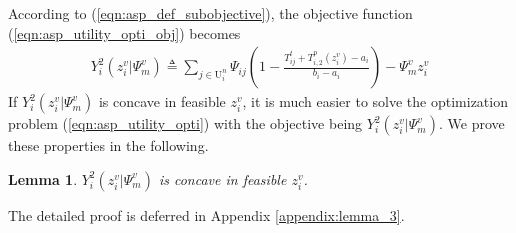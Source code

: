 \documentclass[10pt,journal, compsoc]{IEEEtran}
\newtheorem{lemma}{Lemma}
\begin{document}
According to %
(\ref{eqn:asp_def_subobjective}), the objective function (\ref{eqn:asp_utility_opti_obj}) becomes
\begin{equation} \label{eqn:asp_case2_objective}
\begin{aligned}
Y_i^2(z_i^v|\Psi_m^v) \triangleq \sum_{j \in \mathrm{U}_i^{n}}\Psi_{ij}(1-\frac{T_{ij}^t + T_{i,2}^p(z_i^v)-a_i}{b_i-a_i}) - \Psi_m^vz_i^v
\end{aligned}
\end{equation}
If $Y_i^2(z_i^v|\Psi_m^v)$ is concave in feasible $z_i^v$, it is much easier to solve the optimization problem (\ref{eqn:asp_utility_opti}) with the objective being $Y_i^2(z_i^v|\Psi_m^v)$. We prove these properties in the following.
\begin{lemma} \label{lemma:asp_case2_utility_concave}
$Y_i^2(z_i^v|\Psi_m^v)$ is concave in feasible $z_i^v$.
\end{lemma}
The detailed proof is deferred in Appendix \ref{appendix:lemma_3}.
\end{document}
